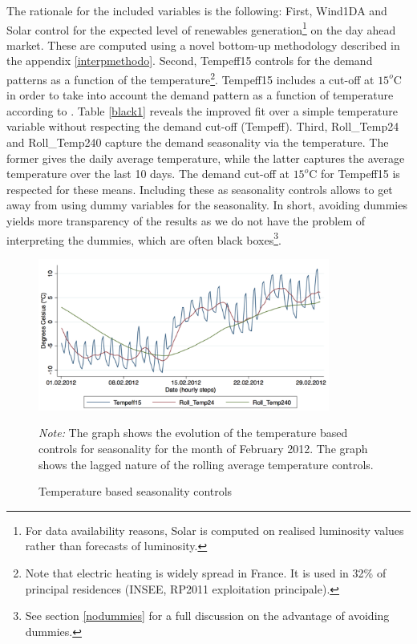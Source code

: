 The rationale for the included variables is the following: 
First, Wind1DA and Solar control for the expected level of renewables generation\footnote{For data availability reasons, Solar is computed on realised luminosity values rather than forecasts of luminosity.} on the day ahead market. These are computed using a novel bottom-up methodology described in the appendix \ref{interpmethodo}. 
Second, Tempeff15 controls for the demand patterns as a function of the temperature\footnote{Note that electric heating is widely spread in France. It is used in 32\% of principal residences (INSEE, RP2011 exploitation principale).}. 
Tempeff15 includes a cut-off at $15^o$C in order to take into account the demand pattern as a function of temperature according to \cite{rtewebsite1}. Table \ref{black1} reveals the improved fit over a simple temperature variable without respecting the demand cut-off (Tempeff). 
Third, Roll\_Temp24 and Roll\_Temp240 capture the demand seasonality via the temperature. The former gives the daily average temperature, while the latter captures the average temperature over the last 10 days. The demand cut-off at $15^o$C for Tempeff15 is respected for these means.  Including these as seasonality controls allows to get away from using dummy variables for the seasonality. In short, avoiding dummies yields more transparency of the results as we do not have the problem of interpreting the dummies, which are often black boxes\footnote{See section \ref{nodummies} for a full discussion on the advantage of avoiding dummies.}. 
\begin{figure}[!ht]
\begin{center}
\includegraphics[height=50mm]{figch2/tempseasonality2.pdf} 
\caption{Temperature based seasonality controls}
\label{tempseasonality2}
\end{center}
\emph{Note: } The graph shows the evolution of the temperature based controls for seasonality for the month of February 2012. The graph shows the lagged nature of the rolling average temperature controls. 
\end{figure}
